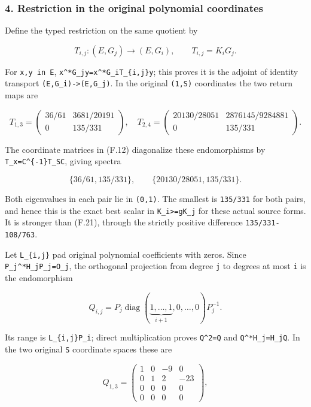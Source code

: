 \subsubsection{4. Restriction in the original polynomial coordinates}\label{endpoint-restriction_fixture--restriction-in-the-original-polynomial-coordinates}

Define the typed restriction on the same quotient by

\[
T_{i,j}:(E,G_j)\longrightarrow(E,G_i),\qquad T_{i,j}=K_iG_j.
\tag{F.22}
\]

For \texttt{x,y\ in\ E}, \texttt{x\^{}*G\_jy=x\^{}*G\_iT\_\{i,j\}y}; this proves it is the adjoint of identity transport \texttt{(E,G\_i)-\textgreater{}(E,G\_j)}. In the original \nolinkurl{(1,S)} coordinates the two return maps are

\[
T_{1,3}=\begin{pmatrix}36/61&3681/20191\\0&135/331\end{pmatrix},
\quad
T_{2,4}=\begin{pmatrix}20130/28051&2876145/9284881\\0&135/331\end{pmatrix}.
\tag{F.23}
\]

The coordinate matrices in (F.12) diagonalize these endomorphisms by \texttt{T\_x=C\^{}\{-1\}T\_SC}, giving spectra

\[
\{36/61,135/331\},\qquad\{20130/28051,135/331\}.
\tag{F.24}
\]

Both eigenvalues in each pair lie in \nolinkurl{(0,1)}. The smallest is \nolinkurl{135/331} for both pairs, and hence this is the exact best scalar in \texttt{K\_i\textgreater{}=gK\_j} for these actual source forms. It is stronger than (F.21), through the strictly positive difference \nolinkurl{135/331-108/763}.

Let \texttt{L\_\{i,j\}} pad original polynomial coefficients with zeros. Since \texttt{P\_j\^{}*H\_jP\_j=O\_j}, the orthogonal projection from degree \nolinkurl{j} to degrees at most \nolinkurl{i} is the endomorphism

\[
Q_{i,j}=P_j\operatorname{diag}(\underbrace{1,\ldots,1}_{i+1},0,\ldots,0)P_j^{-1}.
\tag{F.25}
\]

Its range is \texttt{L\_\{i,j\}P\_i}; direct multiplication proves \texttt{Q\^{}2=Q} and \texttt{Q\^{}*H\_j=H\_jQ}. In the two original \nolinkurl{S} coordinate spaces these are

\[
Q_{1,3}=\begin{pmatrix}
1&0&-9&0\\0&1&2&-23\\0&0&0&0\\0&0&0&0
\end{pmatrix},
\]

